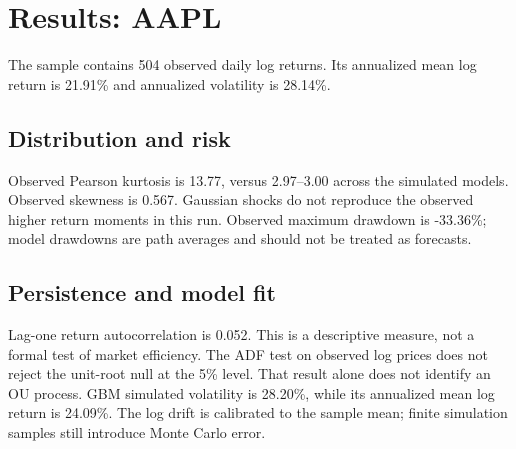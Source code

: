 \documentclass[11pt,a4paper]{article}
\begin{document}
\clearpage
\section{Results: AAPL}
\begin{table}[htbp]\centering
\caption{AAPL: observed and simulated statistics.}
\end{table}
The sample contains 504 observed daily log returns. Its annualized mean log return is 21.91\% and annualized volatility is 28.14\%.

\subsection{Distribution and risk}
Observed Pearson kurtosis is 13.77, versus 2.97--3.00 across the simulated models. Observed skewness is 0.567. Gaussian shocks do not reproduce the observed higher return moments in this run. Observed maximum drawdown is -33.36\%; model drawdowns are path averages and should not be treated as forecasts.

\subsection{Persistence and model fit}
Lag-one return autocorrelation is 0.052. This is a descriptive measure, not a formal test of market efficiency. The ADF test on observed log prices does not reject the unit-root null at the 5\% level. That result alone does not identify an OU process. GBM simulated volatility is 28.20\%, while its annualized mean log return is 24.09\%. The log drift is calibrated to the sample mean; finite simulation samples still introduce Monte Carlo error.
\end{document}
